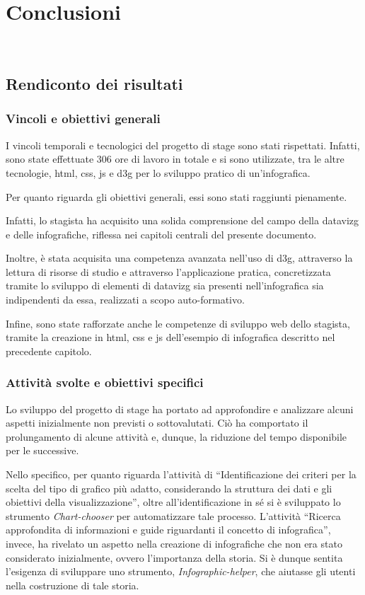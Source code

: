 \chapter{Conclusioni}
\label{cap:conclusioni}
\\

\section{Rendiconto dei risultati}
\subsection{Vincoli e obiettivi generali}
I vincoli temporali e tecnologici del progetto di stage sono stati rispettati. 
Infatti, sono state effettuate 306 ore di lavoro in totale e si sono utilizzate, tra le altre tecnologie, 
\gls{html}, \gls{css}, \gls{js} e \gls{d3g} per lo sviluppo pratico di un'infografica.

\bigskip
\noindent Per quanto riguarda gli obiettivi generali, essi sono stati raggiunti pienamente.

Infatti, lo stagista ha acquisito una solida comprensione del campo 
della \gls{datavizg} e delle infografiche, riflessa nei capitoli centrali del presente documento. 

Inoltre, è stata acquisita una competenza avanzata nell'uso di \gls{d3g}, attraverso la lettura di risorse di studio e 
attraverso l'applicazione pratica, concretizzata tramite lo sviluppo di elementi di \gls{datavizg} sia presenti nell'infografica sia  
indipendenti da essa, realizzati a scopo auto-formativo.

Infine, sono state rafforzate anche le competenze di sviluppo web dello stagista, tramite la creazione in \gls{html}, \gls{css} e \gls{js} dell'esempio di infografica 
descritto nel precedente capitolo.

\subsection{Attività svolte e obiettivi specifici}
Lo sviluppo del progetto di stage ha portato ad approfondire e analizzare alcuni aspetti inizialmente non previsti o sottovalutati. 
Ciò ha comportato il prolungamento di alcune attività e, dunque, la riduzione del tempo disponibile per le successive.

Nello specifico, per quanto riguarda l'attività di ``Identificazione dei criteri per la scelta del tipo di grafico più adatto, considerando la struttura dei
dati e gli obiettivi della visualizzazione'', oltre all'identificazione in sé si è sviluppato lo strumento \emph{Chart-chooser} per automatizzare tale processo. 
L'attività ``Ricerca approfondita di informazioni e guide riguardanti il concetto di infografica'', invece, ha rivelato un aspetto nella creazione di infografiche che 
non era stato considerato inizialmente, ovvero l'importanza della storia. Si è dunque sentita l'esigenza di sviluppare uno strumento, 
\emph{Infographic-helper}, che aiutasse gli utenti nella costruzione di tale storia.

